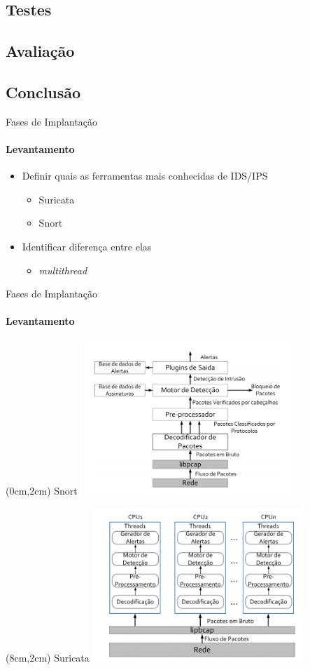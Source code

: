 \documentclass[aspectratio=169]{beamer}
\begin{document}
\subsection{Testes}
\subsection{Avaliação}
\subsection{Conclusão}

\begin{frame}{Fases de Implantação}
  \framesubtitle{Levantamento}
  \begin{itemize}
  	\item Definir quais as ferramentas mais conhecidas de IDS/IPS
  		\begin{itemize}
  			\item Suricata
  			\item Snort
  		\end{itemize}
  	\item Identificar diferença entre elas
  		\begin{itemize}
  			\item \textit{multithread}
  		\end{itemize}
  \end{itemize}
\end{frame}

\begin{frame}{Fases de Implantação}
	\framesubtitle{Levantamento}
	\begin{textblock*}{5cm}(0cm,2cm) %
		\centering Snort
		\includegraphics[width=8cm]{imagens/snort-arquitetura.png}
    \end{textblock*}
    \begin{textblock*}{5cm}(8cm,2cm) %
    	\centering Suricata
    	\includegraphics[width=8cm]{imagens/suricata-arquitetura.png}
    \end{textblock*}
\end{frame}
\end{document}
